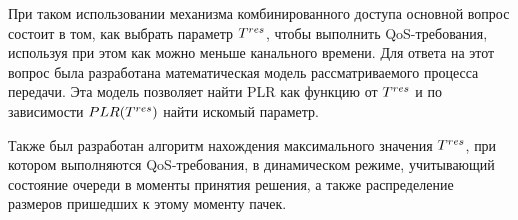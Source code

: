При таком использовании механизма комбинированного доступа основной вопрос состоит в том, как выбрать параметр $T^{res}$, чтобы выполнить QoS-требования, используя при этом как можно меньше канального времени. Для ответа на этот вопрос была разработана математическая модель рассматриваемого процесса передачи. Эта модель позволяет найти PLR как функцию от $T^{res}$ и по зависимости $PLR(T^{res})$ найти искомый параметр.

Также был разработан алгоритм нахождения максимального значения $T^{res}$, при котором выполняются QoS-требования, в динамическом режиме, учитывающий состояние очереди в моменты принятия решения, а также распределение размеров пришедших к этому моменту пачек.






